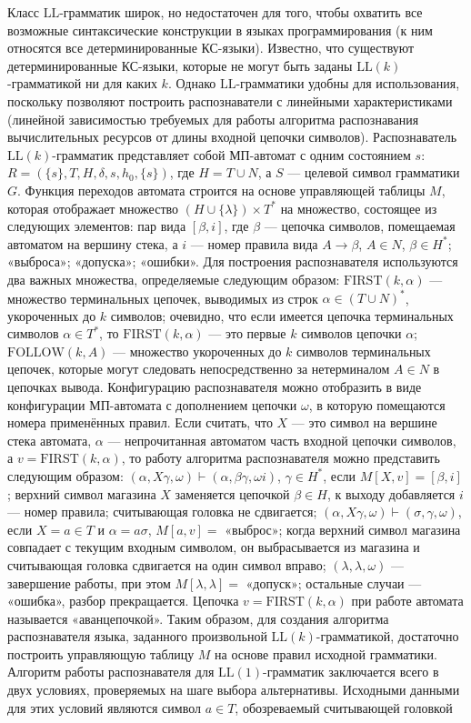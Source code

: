 \documentclass[a4paper,12pt]{article}
\begin{document}
Класс \(\mathrm{LL}\)-грамматик широк, но недостаточен для того, чтобы охватить все возможные синтаксические конструкции в языках программирования (к ним относятся все детерминированные КС-языки). Известно, что существуют детерминированные КС-языки, которые не могут быть заданы \(\mathrm{LL}(k)\)-грамматикой ни для каких \(k\). Однако \(\mathrm{LL}\)-грамматики удобны для использования, поскольку позволяют построить распознаватели с линейными характеристиками (линейной зависимостью требуемых для работы алгоритма распознавания вычислительных ресурсов от длины входной цепочки символов). Распознаватель \(\mathrm{LL}(k)\)-грамматик представляет собой МП-автомат с одним состоянием \(s\): \(R=(\{s\},T,H,\delta,s,h_0,\{s\})\), где \(H=T\cup N\), а \(S\) — целевой символ грамматики \(G\). Функция переходов автомата строится на основе управляющей таблицы \(M\), которая отображает множество \((H\cup\{\lambda\})\times T^*\) на множество, состоящее из следующих элементов: пар вида \([\beta,i]\), где \(\beta\) — цепочка символов, помещаемая автоматом на вершину стека, а \(i\) — номер правила вида \(A\to\beta\), \(A\in N\), \(\beta\in H^*\); «выброса»; «допуска»; «ошибки». Для построения распознавателя используются два важных множества, определяемые следующим образом: \(\mathrm{FIRST}(k,\alpha)\) — множество терминальных цепочек, выводимых из строк \(\alpha\in(T\cup N)^*\), укороченных до \(k\) символов; очевидно, что если имеется цепочка терминальных символов \(\alpha\in T^*\), то \(\mathrm{FIRST}(k,\alpha)\) — это первые \(k\) символов цепочки \(\alpha\); \(\mathrm{FOLLOW}(k,A)\) — множество укороченных до \(k\) символов терминальных цепочек, которые могут следовать непосредственно за нетерминалом \(A\in N\) в цепочках вывода. Конфигурацию распознавателя можно отобразить в виде конфигурации МП-автомата с дополнением цепочки \(\omega\), в которую помещаются номера применённых правил. Если считать, что \(X\) — это символ на вершине стека автомата, \(\alpha\) — непрочитанная автоматом часть входной цепочки символов, а \(v=\mathrm{FIRST}(k,\alpha)\), то работу алгоритма распознавателя можно представить следующим образом: \((\alpha,X\gamma,\omega)\vdash(\alpha,\beta\gamma,\omega i)\), \(\gamma\in H^*\), если \(M[X,v]=[\beta,i]\); верхний символ магазина \(X\) заменяется цепочкой \(\beta\in H\), к выходу добавляется \(i\) — номер правила; считывающая головка не сдвигается; \((\alpha,X\gamma,\omega)\vdash(\sigma,\gamma,\omega)\), если \(X=a\in T\) и \(\alpha=a\sigma\), \(M[a,v]=\) «выброс»; когда верхний символ магазина совпадает с текущим входным символом, он выбрасывается из магазина и считывающая головка сдвигается на один символ вправо; \((\lambda,\lambda,\omega)\) — завершение работы, при этом \(M[\lambda,\lambda]=\) «допуск»; остальные случаи — «ошибка», разбор прекращается. Цепочка \(v=\mathrm{FIRST}(k,\alpha)\) при работе автомата называется «аванцепочкой». Таким образом, для создания алгоритма распознавателя языка, заданного произвольной \(\mathrm{LL}(k)\)-грамматикой, достаточно построить управляющую таблицу \(M\) на основе правил исходной грамматики. Алгоритм работы распознавателя для \(\mathrm{LL}(1)\)-грамматик заключается всего в двух условиях, проверяемых на шаге выбора альтернативы. Исходными данными для этих условий являются символ \(a\in T\), обозреваемый считывающей головкой 
\end{document}
